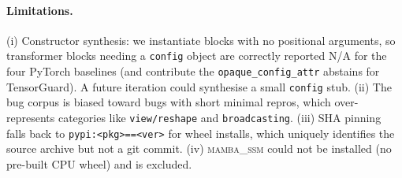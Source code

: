 \paragraph{Limitations.}
(i) Constructor synthesis: we instantiate blocks with no positional
arguments, so transformer blocks needing a \texttt{config} object are
correctly reported \textsc{N/A} for the four PyTorch baselines (and
contribute the \texttt{opaque\_config\_attr} abstains for TensorGuard).
A future iteration could synthesise a small \texttt{config} stub.
(ii) The bug corpus is biased toward bugs with short minimal repros,
which over-represents categories like \texttt{view/reshape} and
\texttt{broadcasting}.  (iii) SHA pinning falls back to
\texttt{pypi:<pkg>==<ver>} for wheel installs, which uniquely identifies
the source archive but not a git commit.  (iv) \textsc{mamba\_ssm} could
not be installed (no pre-built CPU wheel) and is excluded.

